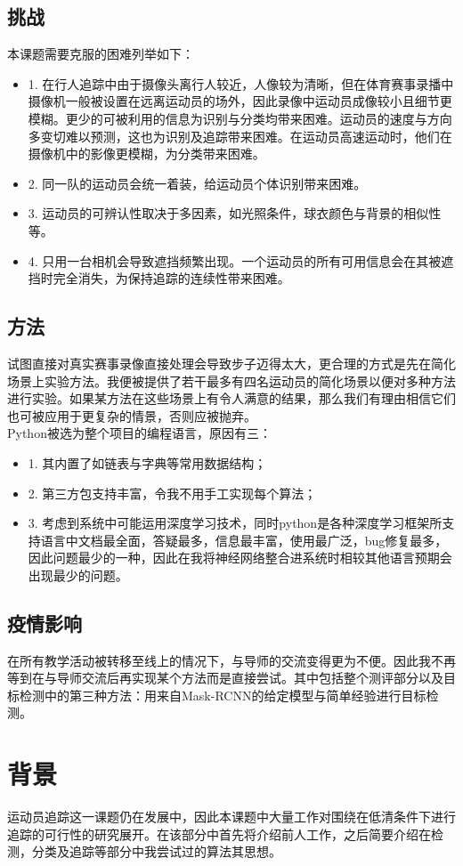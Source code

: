 \documentclass{article}
\begin{document}
\subsection{挑战}
本课题需要克服的困难列举如下：
\begin{itemize}
\item 1. 在行人追踪中由于摄像头离行人较近，人像较为清晰，但在体育赛事录播中摄像机一般被设置在远离运动员的场外，因此录像中运动员成像较小且细节更模糊。更少的可被利用的信息为识别与分类均带来困难。运动员的速度与方向多变切难以预测，这也为识别及追踪带来困难。在运动员高速运动时，他们在摄像机中的影像更模糊，为分类带来困难。
\item 2. 同一队的运动员会统一着装，给运动员个体识别带来困难。
\item 3. 运动员的可辨认性取决于多因素，如光照条件，球衣颜色与背景的相似性等。
\item 4. 只用一台相机会导致遮挡频繁出现。一个运动员的所有可用信息会在其被遮挡时完全消失，为保持追踪的连续性带来困难。
\end{itemize}
\subsection{方法}
试图直接对真实赛事录像直接处理会导致步子迈得太大，更合理的方式是先在简化场景上实验方法。我便被提供了若干最多有四名运动员的简化场景以便对多种方法进行实验。如果某方法在这些场景上有令人满意的结果，那么我们有理由相信它们也可被应用于更复杂的情景，否则应被抛弃。\\
Python被选为整个项目的编程语言，原因有三：
\begin{itemize}
\item 1. 其内置了如链表与字典等常用数据结构；
\item 2. 第三方包支持丰富，令我不用手工实现每个算法；
\item 3. 考虑到系统中可能运用深度学习技术，同时python是各种深度学习框架所支持语言中文档最全面，答疑最多，信息最丰富，使用最广泛，bug修复最多，因此问题最少的一种，因此在我将神经网络整合进系统时相较其他语言预期会出现最少的问题。
\end{itemize}
\subsection{疫情影响}
在所有教学活动被转移至线上的情况下，与导师的交流变得更为不便。因此我不再等到在与导师交流后再实现某个方法而是直接尝试。其中包括整个测评部分以及目标检测中的第三种方法：用来自Mask-RCNN的给定模型与简单经验进行目标检测。
\newpage

\section{背景}
运动员追踪这一课题仍在发展中，因此本课题中大量工作对围绕在低清条件下进行追踪的可行性的研究展开。在该部分中首先将介绍前人工作，之后简要介绍在检测，分类及追踪等部分中我尝试过的算法其思想。
\end{document}
